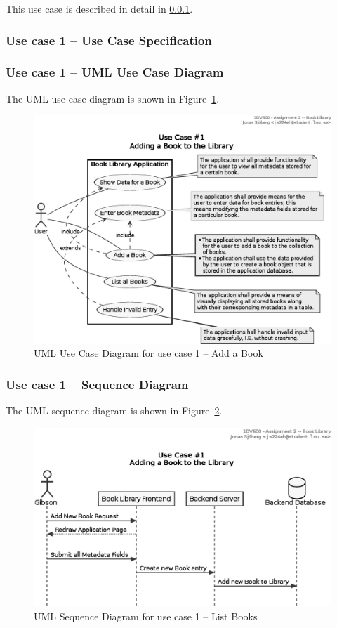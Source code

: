 This use case is described in detail in \ref{task-1a-usecase1spec}.


\subsubsection{Use case 1 -- Use Case Specification}\label{task-1a-usecase1spec}



\subsubsection{Use case 1 -- UML Use Case Diagram}\label{task-1a-usecase1uml}
The UML use case diagram is shown in Figure~\ref{fig:uml-usecase1}.

\begin{figure}[htbp]
  \centering
  \includegraphics[width=0.5\linewidth]{include/uml-use-case-1.eps}
  \caption{UML Use Case Diagram for use case 1 -- Add a Book}
  \label{fig:uml-usecase1}
\end{figure}




\subsubsection{Use case 1 -- Sequence Diagram}\label{task-1a-usecase1seq}
The UML sequence diagram is shown in Figure~\ref{fig:uml-usecase1seq}.

\begin{figure}[htbp]
  \centering
  \includegraphics[width=0.75\linewidth]{include/uml-use-case-1-seq.eps}
  \caption{UML Sequence Diagram for use case 1 -- List Books}
  \label{fig:uml-usecase1seq}
\end{figure}




